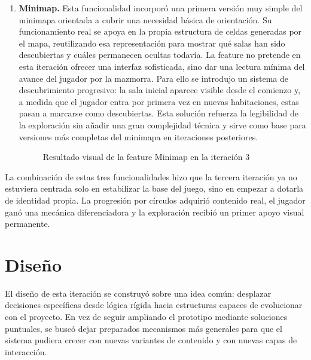 \begin{enumerate}
\begin{figure}[H]
\begin{center}
\caption{Resultado visual de la feature Dualidad de personajes en la iteración 3}
\label{fig:iteracion3-feature-dualidad}
\end{center}
\end{figure}

\item \textbf{Minimap.} Esta funcionalidad incorporó una primera versión muy simple del
minimapa orientada a cubrir una necesidad básica de orientación. Su funcionamiento real se
apoya en la propia estructura de celdas generadas por el mapa, reutilizando esa
representación para mostrar qué salas han sido descubiertas y cuáles permanecen ocultas
todavía. La feature no pretende en esta iteración ofrecer una interfaz sofisticada, sino
dar una lectura mínima del avance del jugador por la mazmorra. Para ello se introdujo un
sistema de descubrimiento progresivo: la sala inicial aparece visible desde el comienzo y,
a medida que el jugador entra por primera vez en nuevas habitaciones, estas pasan a marcarse
como descubiertas. Esta solución refuerza la legibilidad de la exploración sin añadir una
gran complejidad técnica y sirve como base para versiones más completas del minimapa en
iteraciones posteriores.

\begin{figure}[H]
\begin{center}
\caption{Resultado visual de la feature Minimap en la iteración 3}
\label{fig:iteracion3-feature-minimap}
\end{center}
\end{figure}
\end{enumerate}

La combinación de estas tres funcionalidades hizo que la tercera iteración ya no estuviera
centrada solo en estabilizar la base del juego, sino en empezar a dotarla de identidad
propia. La progresión por círculos adquirió contenido real, el jugador ganó una mecánica
diferenciadora y la exploración recibió un primer apoyo visual permanente.

\section{Diseño}
El diseño de esta iteración se construyó sobre una idea común: desplazar decisiones
específicas desde lógica rígida hacia estructuras capaces de evolucionar con el proyecto.
En vez de seguir ampliando el prototipo mediante soluciones puntuales, se buscó dejar
preparados mecanismos más generales para que el sistema pudiera crecer con nuevas variantes
de contenido y con nuevas capas de interacción.

